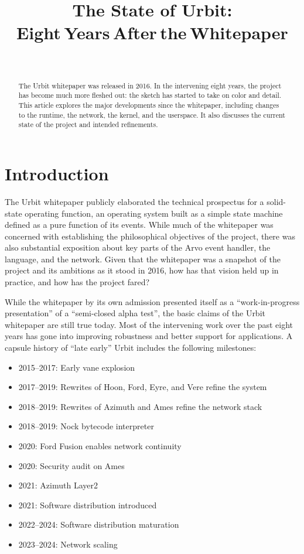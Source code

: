 \documentclass[twoside]{article}
\title{The State of Urbit:\\Eight Years After the Whitepaper}
\author{\authorname~\authorpatp \\ \affiliation}
\date{}
\begin{document}
\maketitle
\thispagestyle{firststyle}

\begin{abstract}
\sloppy
The Urbit whitepaper was released in 2016.  In the intervening eight years, the project has become much more fleshed out:  the sketch has started to take on color and detail.  This article explores the major developments since the whitepaper, including changes to the runtime, the network, the kernel, and the userspace.  It also discusses the current state of the project and intended refinements.
\end{abstract}

\setcounter{page}{1}

\tableofcontents

\section{Introduction}

The Urbit whitepaper \citep{Whitepaper} publicly elaborated the technical prospectus for a solid-state operating function, an operating system built as a simple state machine defined as a pure function of its events.  While much of the whitepaper was concerned with establishing the philosophical objectives of the project, there was also substantial exposition about key parts of the Arvo event handler, the language, and the network.  Given that the whitepaper was a snapshot of the project and its ambitions as it stood in 2016, how has that vision held up in practice, and how has the project fared?

While the whitepaper by its own admission presented itself as a ``work-in-progress presentation'' of a ``semi-closed alpha test'', the basic claims of the Urbit whitepaper are still true today.  Most of the intervening work over the past eight years has gone into improving robustness and better support for applications.  A capsule history of ``late early'' Urbit includes the following milestones:
\begin{itemize}
  \item  2015–2017:  Early vane explosion
  \item  2017–2019:  Rewrites of Hoon, Ford, Eyre, and Vere refine the system
  \item  2018–2019:  Rewrites of Azimuth and Ames refine the network stack
  \item  2018–2019:  Nock bytecode interpreter
  \item  2020:  Ford Fusion enables network continuity
  \item  2020:  Security audit on Ames
  \item  2021:  Azimuth Layer2
  \item  2021:  Software distribution introduced
  \item  2022–2024:  Software distribution maturation
  \item  2023–2024:  Network scaling
\end{itemize}
\end{document}
